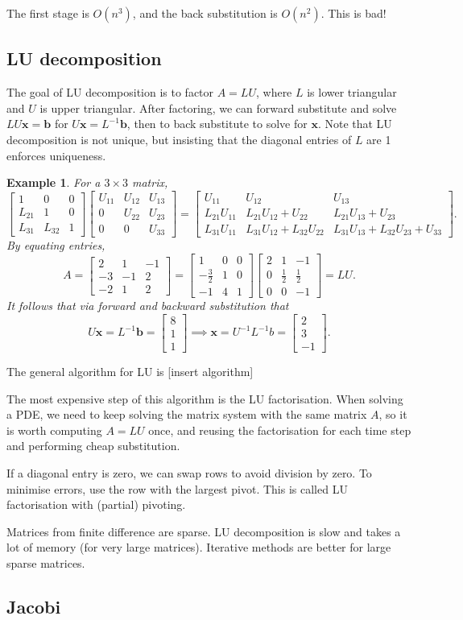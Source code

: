 \documentclass[11pt, a4paper]{article}
\newcommand{\inv}{^{-1}}
\theoremstyle{break}
\newtheorem{eg}[thm]{Example}
\def\matrixthreeHelp(#1,#2,#3,#4,#5,#6,#7,#8,#9){\begin{bmatrix}#1&#2&#3\\#4&#5&#6\\#7&#8&#9 \end{bmatrix}}%
\newcommand*{\matrixthree}[1]{\matrixthreeHelp(#1)}
\newcommand{\ve}{\mathbf} %
\begin{document}
The first stage is $O(n^3)$, and the back substitution is $O(n^2)$. This is bad!


\subsection{LU decomposition}
The goal of LU decomposition is to factor $A=LU$, where $L$ is lower triangular and $U$ is upper triangular. After factoring, we can forward substitute and solve $LU\ve x=\ve b$ for $U\ve x=L\inv \ve b$, then to back substitute to solve for $\ve x$. Note that LU decomposition is not unique, but insisting that the diagonal entries of $L$ are 1 enforces uniqueness.
\begin{eg} For a $3\times3$ matrix,
	\[\matrixthree{1,0,0,L_{21},1,0,L_{31},L_{32},1}\matrixthree{U_{11},U_{12},U_{13},0,U_{22},U_{23},0,0,U_{33}}=\matrixthree{U_{11},U_{12},U_{13},L_{21}U_{11},L_{21}U_{12}+U_{22},L_{21}U_{13}+U_{23},L_{31}U_{11},L_{31}U_{12}+L_{32}U_{22},L_{31}U_{13}+L_{32}U_{23}+U_{33}}.\] By equating entries, \[A=\matrixthree{2,1,-1,-3,-1,2,-2,1,2} = \matrixthree{1,0,0,-\frac32,1,0,-1,4,1}\matrixthree{2,1,-1,0,\frac12,\frac12,0,0,-1}=LU.\]
	It follows that via forward and backward substitution that \[U\ve x=L\inv \ve b=\begin{bmatrix} 8\\1\\1\end{bmatrix} \implies \ve x=U\inv L\inv b=\begin{bmatrix}2\\3\\-1\end{bmatrix}.\]
\end{eg}
The general algorithm for LU is [insert algorithm]

The most expensive step of this algorithm is the LU factorisation. When solving a PDE, we need to keep solving the matrix system with the same matrix $A$, so it is worth computing $A=LU$ once, and reusing the factorisation for each time step and performing cheap substitution.

If a diagonal entry is zero, we can swap rows to avoid division by zero. To minimise errors, use the row with the largest pivot. This is called LU factorisation with (partial) pivoting.

Matrices from finite difference are sparse. LU decomposition is slow and takes a lot of memory (for very large matrices). Iterative methods are better for large sparse matrices.


\subsection{Jacobi}
\end{document}
